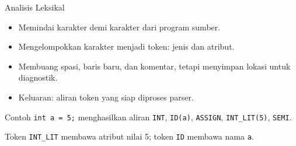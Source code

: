 \documentclass[aspectratio=169,10pt,t]{beamer}
\begin{document}
\begin{frame}{Analisis Leksikal}
  \begin{itemize}
    \item Memindai karakter demi karakter dari program sumber.
    \item Mengelompokkan karakter menjadi token: jenis dan atribut.
    \item Membuang spasi, baris baru, dan komentar, tetapi menyimpan
          lokasi untuk diagnostik.
    \item Keluaran: aliran token yang siap diproses parser.
  \end{itemize}

  \vspace{4pt}
  \begin{exampleblock}{Contoh}
    \texttt{int a = 5;} menghasilkan aliran
    \texttt{INT}, \texttt{ID(a)}, \texttt{ASSIGN},
    \texttt{INT\_LIT(5)}, \texttt{SEMI}.
  \end{exampleblock}

  \vspace{2pt}
  {\footnotesize Token \texttt{INT\_LIT} membawa atribut nilai 5;
  token \texttt{ID} membawa nama \texttt{a}.}
\end{frame}
\end{document}
